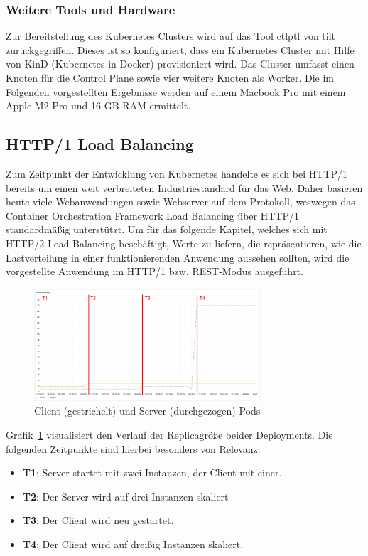 \subsubsection{Weitere Tools und Hardware}
Zur Bereitstellung des Kubernetes Clusters wird auf das Tool ctlptl von tilt zurückgegriffen.
Dieses ist so konfiguriert, dass ein Kubernetes Cluster mit Hilfe von KinD (Kubernetes in Docker) provisioniert wird.
Das Cluster umfasst einen Knoten für die Control Plane sowie vier weitere Knoten als Worker.
Die im Folgenden vorgestellten Ergebnisse werden auf einem Macbook Pro mit einem Apple M2 Pro und 16 GB RAM ermittelt.

\newpage

\subsection{HTTP/1 Load Balancing}\label{subsec:http/1-load-balancing}
Zum Zeitpunkt der Entwicklung von Kubernetes handelte es sich bei HTTP/1 bereits um einen weit verbreiteten Industriestandard für das Web.
Daher basieren heute viele Webanwendungen sowie Webserver auf dem Protokoll, weswegen das Container Orchestration Framework Load Balancing über HTTP/1 standardmäßig unterstützt.
Um für das folgende Kapitel, welches sich mit HTTP/2 Load Balancing beschäftigt, Werte zu liefern, die repräsentieren, wie die Lastverteilung in einer funktionierenden Anwendung aussehen sollten, wird die vorgestellte Anwendung im HTTP/1 bzw. REST-Modus ausgeführt.
\begin{figure}[H]
    \centering
    \includegraphics[width=0.75\textwidth]{img/rest_pods}
    \caption{Client (gestrichelt) und Server (durchgezogen) Pods}
    \label{fig:rest_pods}
\end{figure}

Grafik~\ref{fig:rest_pods} visualisiert den Verlauf der Replicagröße beider Deployments.
Die folgenden Zeitpunkte sind hierbei besonders von Relevanz:
\begin{itemize}
    \item \textbf{T1}: Server startet mit zwei Instanzen, der Client mit einer.
    \item \textbf{T2}: Der Server wird auf drei Instanzen skaliert
    \item \textbf{T3}: Der Client wird neu gestartet.
    \item \textbf{T4}: Der Client wird auf dreißig Instanzen skaliert.
\end{itemize}

